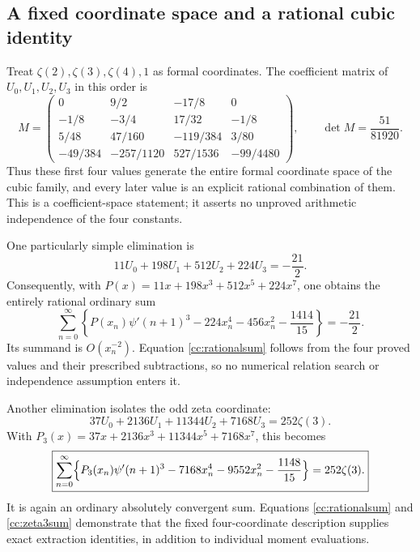 \documentclass[11pt,letterpaper]{article}
\theoremstyle{definition}
\theoremstyle{remark}
\numberwithin{equation}{section}
\begin{document}
\subsection{A fixed coordinate space and a rational cubic identity}

Treat $\zeta(2),\zeta(3),\zeta(4),1$ as formal coordinates.
The coefficient matrix of $U_0,U_1,U_2,U_3$ in this order is
\begin{equation}\label{cc:matrix}
 M=\begin{pmatrix}
 0&9/2&-17/8&0\\
 -1/8&-3/4&17/32&-1/8\\
 5/48&47/160&-119/384&3/80\\
 -49/384&-257/1120&527/1536&-99/4480
 \end{pmatrix},\qquad
 \det M=\frac{51}{81920}.
\end{equation}
Thus these first four values generate the entire formal coordinate
space of the cubic family, and every later value is an explicit
rational combination of them.  This is a coefficient-space statement;
it asserts no unproved arithmetic independence of the four constants.

One particularly simple elimination is
\begin{equation}\label{cc:rationalmoment}
 11U_0+198U_1+512U_2+224U_3=-\frac{21}{2}.
\end{equation}
Consequently, with
$P(x)=11x+198x^3+512x^5+224x^7$, one obtains the entirely rational
ordinary sum
\begin{equation}\label{cc:rationalsum}
 \boxed{\displaystyle
 \sum_{n=0}^{\infty}\left\{
 P(x_n)\psi'(n+1)^3-224x_n^4-456x_n^2-\frac{1414}{15}
 \right\}=-\frac{21}{2}.}
\end{equation}
Its summand is $O(x_n^{-2})$.  Equation \eqref{cc:rationalsum}
follows from the four proved values and their prescribed subtractions,
so no numerical relation search or independence assumption enters it.

Another elimination isolates the odd zeta coordinate:
\begin{equation}\label{cc:zeta3moment}
37U_0+2136U_1+11344U_2+7168U_3=252\zeta(3).
\end{equation}
With $P_3(x)=37x+2136x^3+11344x^5+7168x^7$, this becomes
\begin{equation}\label{cc:zeta3sum}
 \boxed{\begin{aligned}
 \sum_{n=0}^{\infty}\Bigl\{P_3(x_n)\psi'(n+1)^3
  -7168x_n^4-9552x_n^2-\frac{1148}{15}\Bigr\}
  =252\zeta(3).
 \end{aligned}}
\end{equation}
It is again an ordinary absolutely convergent sum. Equations
\eqref{cc:rationalsum} and \eqref{cc:zeta3sum} demonstrate that
the fixed four-coordinate description supplies exact extraction
identities, in addition to individual moment evaluations.
\end{document}
